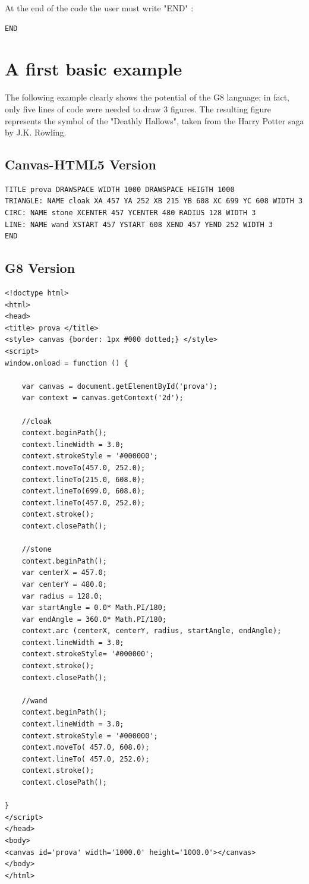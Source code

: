 \documentclass[a4paper]{article}
\begin{document}
At the end of the code the user must write "END" :
\begin{verbatim}
END
\end{verbatim}

\newpage

\section{A first basic example}

The following example clearly shows the potential of the G8 language; in fact, only five lines of code were needed to draw 3 figures.
The resulting figure represents the symbol of the "Deathly Hallows", taken from the Harry Potter saga by J.K. Rowling.

\subsection{Canvas-HTML5 Version}
\begin{verbatim}
TITLE prova DRAWSPACE WIDTH 1000 DRAWSPACE HEIGTH 1000
TRIANGLE: NAME cloak XA 457 YA 252 XB 215 YB 608 XC 699 YC 608 WIDTH 3
CIRC: NAME stone XCENTER 457 YCENTER 480 RADIUS 128 WIDTH 3
LINE: NAME wand XSTART 457 YSTART 608 XEND 457 YEND 252 WIDTH 3
END
\end{verbatim}

\subsection{G8 Version}
\begin{verbatim}
<!doctype html>
<html>
<head>
<title> prova </title>
<style> canvas {border: 1px #000 dotted;} </style>
<script>
window.onload = function () {

	var canvas = document.getElementById('prova');
	var context = canvas.getContext('2d'); 

	//cloak
	context.beginPath();
	context.lineWidth = 3.0;
	context.strokeStyle = '#000000';
	context.moveTo(457.0, 252.0);
	context.lineTo(215.0, 608.0);
	context.lineTo(699.0, 608.0);
	context.lineTo(457.0, 252.0);
	context.stroke();
	context.closePath();

	//stone
	context.beginPath();
	var centerX = 457.0;
	var centerY = 480.0;
	var radius = 128.0;
	var startAngle = 0.0* Math.PI/180;
	var endAngle = 360.0* Math.PI/180;
	context.arc (centerX, centerY, radius, startAngle, endAngle);
	context.lineWidth = 3.0;
	context.strokeStyle= '#000000';
	context.stroke();
	context.closePath();

	//wand
	context.beginPath();
	context.lineWidth = 3.0;
	context.strokeStyle = '#000000';
	context.moveTo( 457.0, 608.0);
	context.lineTo( 457.0, 252.0);
	context.stroke();
	context.closePath();

}
</script>
</head>
<body>
<canvas id='prova' width='1000.0' height='1000.0'></canvas>
</body>
</html>

\end{verbatim}
\end{document}
